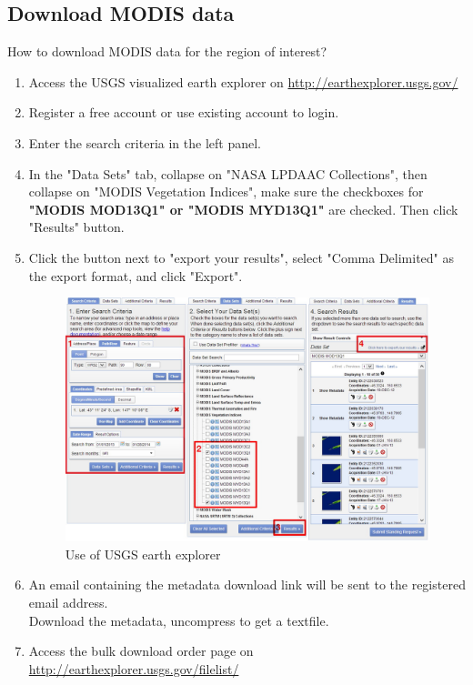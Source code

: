\subsection{Download MODIS data}\label{Section:Download the MODIS data}
How to download MODIS data for the region of interest?
\begin{enumerate}
\item
Access the USGS visualized earth explorer on \href{http://earthexplorer.usgs.gov/}{http://earthexplorer.usgs.gov/}
\item
Register a free account or use existing account to login.
\item
Enter the search criteria in the left panel.
\item \label{Step:select dataset}
In the "Data Sets" tab, collapse on "NASA LPDAAC Collections", then collapse on "MODIS Vegetation Indices", make sure the checkboxes for \textbf{"MODIS MOD13Q1" or "MODIS MYD13Q1"} are checked. Then click "Results" button.
\item
Click the button next to "export your results", select "Comma Delimited" as the export format, and click "Export".
\begin{figure}[H]\begin{center}
	\includegraphics[width=\textwidth]{gfx/appendixf2.jpg}
	\caption{Use of USGS earth explorer}
\end{center}\end{figure}
\item
An email containing the metadata download link will be sent to the registered email address.\\ Download the metadata, uncompress to get a textfile.
\item
Access the bulk download order page on \href{http://earthexplorer.usgs.gov/filelist/}{http://earthexplorer.usgs.gov/filelist/}

\end{enumerate}
